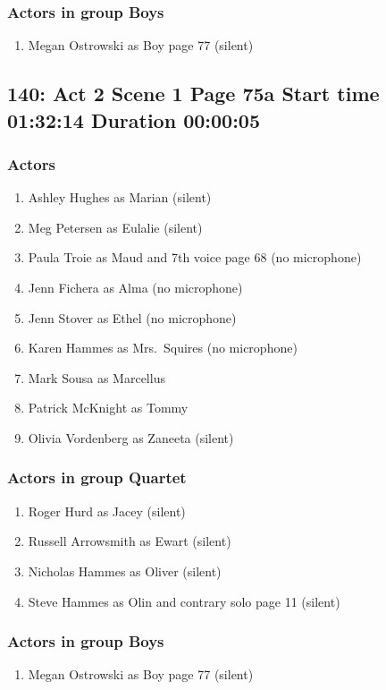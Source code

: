 \subsubsection{Actors in group Boys}
\begin{enumerate}
\item Megan Ostrowski as Boy page 77 (silent)
\end{enumerate}


\subsection{140: Act 2 Scene 1 Page 75a Start time 01:32:14 Duration 00:00:05}

\subsubsection{Actors}
\begin{enumerate}
\item Ashley Hughes as Marian (silent)
\item Meg Petersen as Eulalie (silent)
\item Paula Troie as Maud and 7th voice page 68 (no microphone)
\item Jenn Fichera as Alma (no microphone)
\item Jenn Stover as Ethel (no microphone)
\item Karen Hammes as Mrs.~Squires (no microphone)
\item Mark Sousa as Marcellus
\item Patrick McKnight as Tommy
\item Olivia Vordenberg as Zaneeta (silent)
\end{enumerate}
\subsubsection{Actors in group Quartet}
\begin{enumerate}
\item Roger Hurd as Jacey (silent)
\item Russell Arrowsmith as Ewart (silent)
\item Nicholas Hammes as Oliver (silent)
\item Steve Hammes as Olin and contrary solo page 11 (silent)
\end{enumerate}
\subsubsection{Actors in group Boys}
\begin{enumerate}
\item Megan Ostrowski as Boy page 77 (silent)
\end{enumerate}


